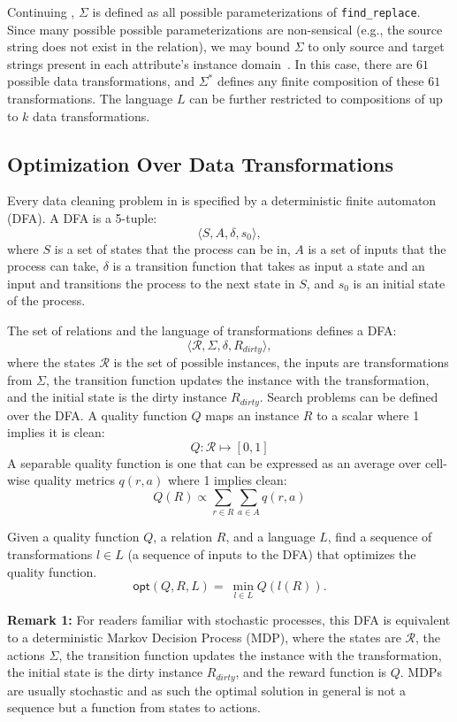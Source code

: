 \begin{example}\label{ex2}
  Continuing , $\Sigma$ is defined as all possible parameterizations of \texttt{find\_replace}.  Since many possible possible parameterizations are non-sensical (e.g., the source string does not exist in the relation), we may bound $\Sigma$ to only source and target strings present in each attribute's instance domain~\cite{workthatdoesthis}.  In this case, there are $61$ possible data transformations, and $\Sigma^*$ defines any finite composition of these $61$ transformations.  The language $L$ can be further restricted to compositions of up to $k$ data transformations.  
\end{example}


\subsection{Optimization Over Data Transformations}
Every data cleaning problem in \sys is specified by a deterministic finite automaton (DFA). 
A DFA is a 5-tuple:
\[\langle S, A, \delta, s_0\rangle,\]
where $S$ is a set of states that the process can be in, $A$ is a set of inputs that the process can take, $\delta$ is a transition function that takes as input a state and an input and transitions the process to the next state in $S$, and $s_0$ is an initial state of the process.

The set of relations and the language of transformations defines a DFA:
\[\langle \mathcal{R}, \Sigma, \delta, R_{dirty}\rangle, \]
where the states $\mathcal{R}$ is the set of possible instances, the inputs are transformations from $\Sigma$, the transition function updates the instance with the transformation, and the initial state is the dirty instance $R_{dirty}$. Search problems can be defined over the DFA. 
A quality function $Q$ maps an instance $R$ to a scalar where 1 implies it is clean:
\[
Q: \mathcal{R} \mapsto [0,1]
\]
A separable quality function is one that can be expressed as an average over cell-wise quality metrics $q(r,a)$ where 1 implies clean:
\[
Q(R) \propto \sum_{r \in R} \sum_{a \in A} q(r,a)
\]
\begin{problem}
Given a quality function $Q$, a relation $R$, and a language $L$, find a sequence of transformations $l \in L$ (a sequence of inputs to the DFA) that optimizes the quality function.
\[
\textsf{opt}(Q,R,L) = ~ \min_{l \in L} Q( l(R) ).  
\]
\end{problem}

\vspace{0.5em} \noindent \textbf{Remark 1: } For readers familiar with stochastic processes, this DFA is equivalent to a deterministic Markov Decision Process (MDP), where the states are $\mathcal{R}$, the actions $\Sigma$, the transition function updates the instance with the transformation, the initial state is the dirty instance $R_{dirty}$, and the reward function is $Q$. MDPs are usually stochastic and as such the optimal solution in general is not a sequence but a function from states to actions.


